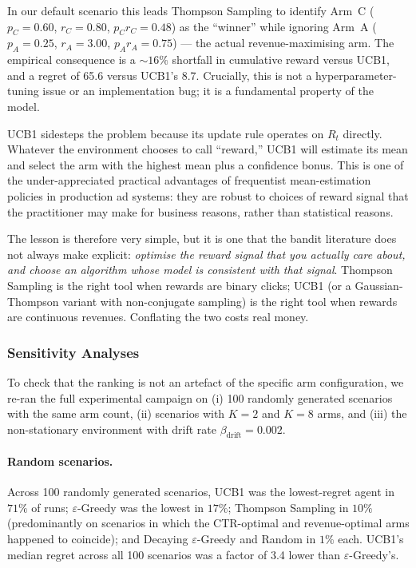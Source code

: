 In our default scenario this leads Thompson Sampling to identify Arm~C ($p_C = 0.60$, $r_C = 0.80$, $p_C r_C = 0.48$) as the ``winner'' while ignoring Arm~A ($p_A = 0.25$, $r_A = 3.00$, $p_A r_A = 0.75$) --- the actual revenue-maximising arm. The empirical consequence is a $\sim 16\%$ shortfall in cumulative reward versus UCB1, and a regret of 65.6 versus UCB1's 8.7. Crucially, this is not a hyperparameter-tuning issue or an implementation bug; it is a fundamental property of the model.

UCB1 sidesteps the problem because its update rule operates on $R_t$ directly. Whatever the environment chooses to call ``reward,'' UCB1 will estimate its mean and select the arm with the highest mean plus a confidence bonus. This is one of the under-appreciated practical advantages of frequentist mean-estimation policies in production ad systems: they are robust to choices of reward signal that the practitioner may make for business reasons, rather than statistical reasons.

The lesson is therefore very simple, but it is one that the bandit literature does not always make explicit: \emph{optimise the reward signal that you actually care about, and choose an algorithm whose model is consistent with that signal}. Thompson Sampling is the right tool when rewards are binary clicks; UCB1 (or a Gaussian-Thompson variant with non-conjugate sampling) is the right tool when rewards are continuous revenues. Conflating the two costs real money.

\subsubsection{Sensitivity Analyses}
To check that the ranking is not an artefact of the specific arm configuration, we re-ran the full experimental campaign on (i) 100 randomly generated scenarios with the same arm count, (ii) scenarios with $K = 2$ and $K = 8$ arms, and (iii) the non-stationary environment with drift rate $\beta_{\text{drift}} = 0.002$.

\paragraph{Random scenarios.} Across 100 randomly generated scenarios, UCB1 was the lowest-regret agent in $71\%$ of runs; $\varepsilon$-Greedy was the lowest in $17\%$; Thompson Sampling in $10\%$ (predominantly on scenarios in which the CTR-optimal and revenue-optimal arms happened to coincide); and Decaying $\varepsilon$-Greedy and Random in $1\%$ each. UCB1's median regret across all 100 scenarios was a factor of 3.4 lower than $\varepsilon$-Greedy's.

